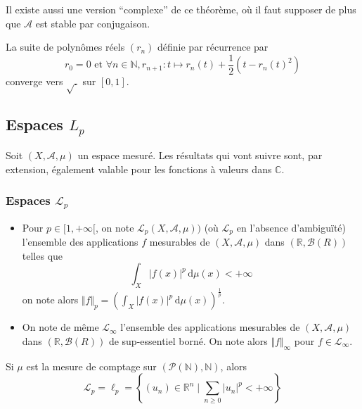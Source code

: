 	\begin{remark}
		Il existe aussi une version ``complexe'' de ce théorème, où il faut supposer de plus que $\mathcal{A}$ est stable par conjugaison.
	\end{remark}

	\begin{example}
		La suite de polynômes réels $(r_n)$ définie par récurrence par
		\[ r_0 = 0 \text{ et } \forall n \in \mathbb{N}, r_{n+1} : t \mapsto r_n(t) + \frac{1}{2} (t - r_n(t)^2) \]
		converge vers $\sqrt{.}$ sur $[0,1]$.
	\end{example}

	\subsection{Espaces \texorpdfstring{$L_p$}{Lp}}


	Soit $(X, \mathcal{A}, \mu)$ un espace mesuré. Les résultats qui vont suivre sont, par extension, également valable pour les fonctions à valeurs dans $\mathbb{C}$.

	\subsubsection{Espaces \texorpdfstring{$\mathcal{L}_p$}{ℒp}}

	\begin{definition}
		\begin{itemize}
			\item Pour $p \in [1, +\infty[$, on note $\mathcal{L}_p(X, \mathcal{A}, \mu))$ (où $\mathcal{L}_p$ en l'absence d'ambiguïté) l'ensemble des applications $f$ mesurables de $(X, \mathcal{A}, \mu)$ dans $(\mathbb{R}, \mathcal{B}(R))$ telles que
			\[ \int_X \vert f(x) \vert^p \, \mathrm{d}\mu(x) < +\infty \]
			on note alors $\Vert f \Vert_p = \left(\int_X \vert f(x) \vert^p \, \mathrm{d}\mu(x)\right)^{\frac{1}{p}}$.
			\item On note de même $\mathcal{L}_\infty$ l'ensemble des applications mesurables de $(X, \mathcal{A}, \mu)$ dans $(\mathbb{R}, \mathcal{B}(R))$ de sup-essentiel borné. On note alors $\Vert f \Vert_\infty$ pour $f \in \mathcal{L}_\infty$.
		\end{itemize}
	\end{definition}


	\begin{example}
		Si $\mu$ est la mesure de comptage sur $(\mathcal{P}(\mathbb{N}), \mathbb{N})$, alors
		\[ \mathcal{L}_p = \ell_p = \left\{ (u_n) \in \mathbb{R}^n \mid \sum_{n \geq 0} \vert u_n \vert^p < +\infty \right\} \]
	\end{example}


